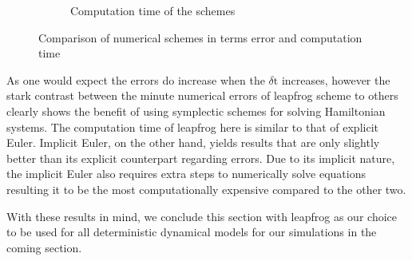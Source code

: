 \begin{figure}[H]
\begin{subfigure}{.49\textwidth}
        \caption{Computation time of the schemes}
        \label{plot:scheme_time}
    \end{subfigure}
    \caption{Comparison of numerical schemes in terms error and computation time}
    \label{plot:errors}
\end{figure}

As one would expect the errors do increase when the $\delta \text{t}$ increases, however the stark contrast between the minute numerical errors of leapfrog scheme to others clearly shows the benefit of using symplectic schemes for solving Hamiltonian systems. The computation time of leapfrog here is similar to that of explicit Euler. Implicit Euler, on the other hand, yields results that are only slightly better than its explicit counterpart regarding errors. Due to its implicit nature, the implicit Euler also requires extra steps to numerically solve equations resulting it to be the most computationally expensive compared to the other two.

With these results in mind, we conclude this section with leapfrog as our choice to be used for all deterministic dynamical models for our simulations in the coming section.
